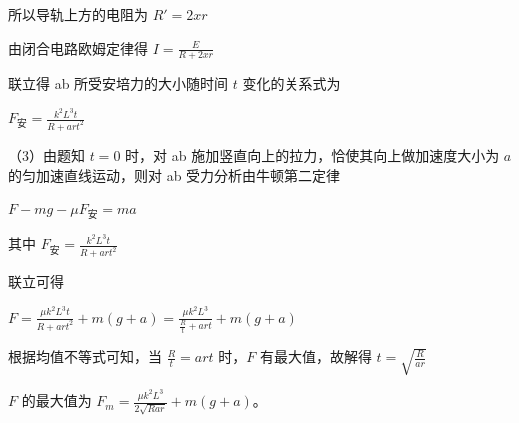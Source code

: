 \documentclass[\gkver]{gaokaozhenti}
\begin{document}
\begin{enumerate}
{所以导轨上方的电阻为 $R' = 2xr$

由闭合电路欧姆定律得 $I = \frac{E}{R + 2xr}$

联立得 ab 所受安培力的大小随时间 $t$ 变化的关系式为

$F_{\text{安}} = \frac{k^{2}L^{3}t}{R + art^{2}}$

（3）由题知 $t = 0$ 时，对 ab 施加竖直向上的拉力，恰使其向上做加速度大小为 $a$ 的匀加速直线运动，则对 ab 受力分析由牛顿第二定律

$F - mg - \mu F_{\text{安}} = ma$

其中 $F_{\text{安}} = \frac{k^{2}L^{3}t}{R + art^{2}}$

联立可得

$F = \frac{\mu k^{2}L^{3}t}{R + art^{2}} + m(g + a) = \frac{\mu k^{2}L^{3}}{\frac{R}{t} + art} + m(g + a)$

根据均值不等式可知，当 $\frac{R}{t} = art$ 时，$F$ 有最大值，故解得 $t = \sqrt{\frac{R}{ar}}$

$F$ 的最大值为 $F_{m} = \frac{\mu k^{2}L^{3}}{2\sqrt{Rar}} + m(g + a)$。
}

\end{enumerate}
\end{document}

